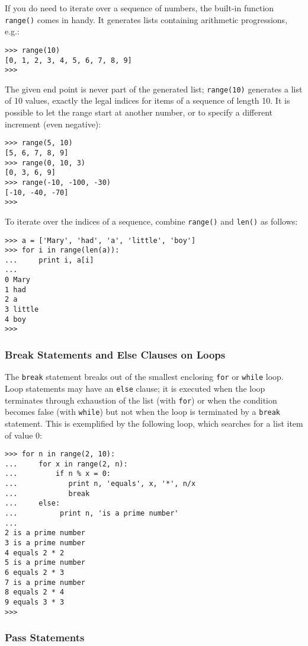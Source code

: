 If you do need to iterate over a sequence of numbers, the built-in
function {\tt range()} comes in handy.
It generates lists containing arithmetic progressions,
e.g.:
\bcode\begin{verbatim}
>>> range(10)
[0, 1, 2, 3, 4, 5, 6, 7, 8, 9]
>>>
\end{verbatim}\ecode
The given end point is never part of the generated list;
{\tt range(10)} generates a list of 10 values,
exactly the legal indices for items of a sequence of length 10.
It is possible to let the range start at another number, or to specify a
different increment (even negative):
\bcode\begin{verbatim}
>>> range(5, 10)
[5, 6, 7, 8, 9]
>>> range(0, 10, 3)
[0, 3, 6, 9]
>>> range(-10, -100, -30)
[-10, -40, -70]
>>>
\end{verbatim}\ecode
To iterate over the indices of a sequence, combine {\tt range()}
and {\tt len()} as follows:
\bcode\begin{verbatim}
>>> a = ['Mary', 'had', 'a', 'little', 'boy']
>>> for i in range(len(a)):
...     print i, a[i]
...
0 Mary
1 had
2 a
3 little
4 boy
>>>
\end{verbatim}\ecode

\subsubsection{Break Statements and Else Clauses on Loops}

The {\tt break} statement breaks out of the smallest enclosing {\tt for}
or {\tt while} loop.
Loop statements may have an {\tt else} clause; it is executed when the
loop terminates through exhaustion of the list (with {\tt for}) or when
the condition becomes false (with {\tt while}) but not when the loop is
terminated by a {\tt break} statement.
This is exemplified by the following loop, which searches for a list
item of value 0:
\bcode\begin{verbatim}
>>> for n in range(2, 10):
...     for x in range(2, n):
...         if n % x = 0:
...            print n, 'equals', x, '*', n/x
...            break
...     else:
...          print n, 'is a prime number'
...
2 is a prime number
3 is a prime number
4 equals 2 * 2
5 is a prime number
6 equals 2 * 3
7 is a prime number
8 equals 2 * 4
9 equals 3 * 3
>>>
\end{verbatim}\ecode

\subsubsection{Pass Statements}

